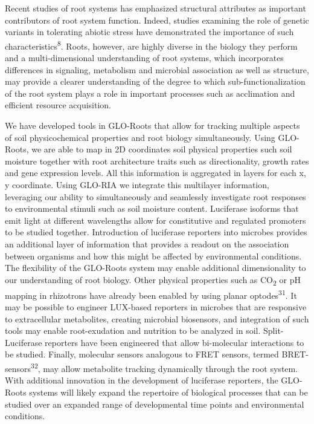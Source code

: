 \documentclass[]{article}
\begin{document}
Recent studies of root systems has emphasized structural attributes as
important contributors of root system function. Indeed, studies
examining the role of genetic variants in tolerating abiotic stress have
demonstrated the importance of such characteristics\textsuperscript{8}.
Roots, however, are highly diverse in the biology they perform and a
multi-dimensional understanding of root systems, which incorporates
differences in signaling, metabolism and microbial association as well
as structure, may provide a clearer understanding of the degree to which
sub-functionalization of the root system plays a role in important
processes such as acclimation and efficient resource acquisition.

We have developed tools in GLO-Roots that allow for tracking multiple
aspects of soil physicochemical properties and root biology
simultaneously. Using GLO-Roots, we are able to map in 2D coordinates
soil physical properties such soil moisture together with root
architecture traits such as directionality, growth rates and gene
expression levels. All this information is aggregated in layers for each
x, y coordinate. Using GLO-RIA we integrate this multilayer information,
leveraging our ability to simultaneously and seamlessly investigate root
responses to environmental stimuli such as soil moisture content.
Luciferase isoforms that emit light at different wavelengths allow for
constitutive and regulated promoters to be studied together.
Introduction of luciferase reporters into microbes provides an
additional layer of information that provides a readout on the
association between organisms and how this might be affected by
environmental conditions. The flexibility of the GLO-Roots system may
enable additional dimensionality to our understanding of root biology.
Other physical properties such as CO\textsubscript{2} or pH mapping in
rhizotrons have already been enabled by using planar
optodes\textsuperscript{31}. It may be possible to engineer LUX-based
reporters in microbes that are responsive to extracellular metabolites,
creating microbial biosensors, and integration of such tools may enable
root-exudation and nutrition to be analyzed in soil. Split-Luciferase
reporters have been engineered that allow bi-molecular interactions to
be studied. Finally, molecular sensors analogous to FRET sensors, termed
BRET-sensors\textsuperscript{32}, may allow metabolite tracking
dynamically through the root system. With additional innovation in the
development of luciferase reporters, the GLO-Roots systems will likely
expand the repertoire of biological processes that can be studied over
an expanded range of developmental time points and environmental
conditions.
\end{document}
